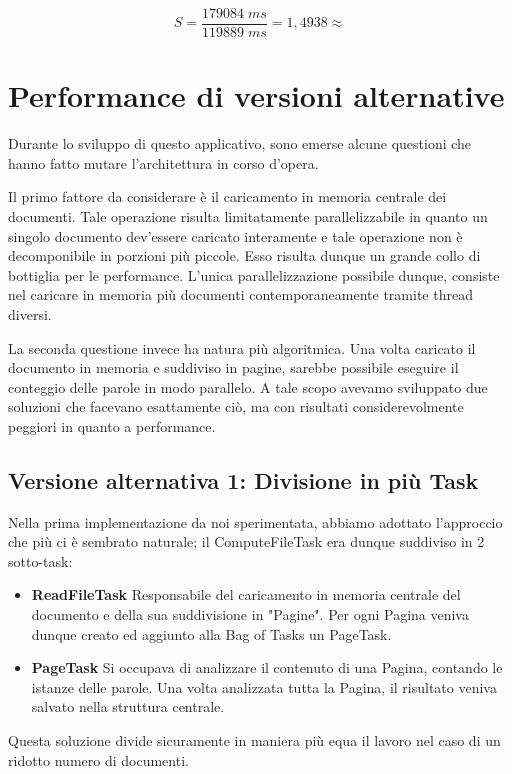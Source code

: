 $$ S = \frac{179084\;ms}{119889\;ms} = 1,4938 \approx$$
\section{Performance di versioni alternative}
Durante lo sviluppo di questo applicativo, sono emerse alcune questioni che hanno fatto mutare l'architettura in corso d'opera.\newline

\noindent Il primo fattore da considerare è il caricamento in memoria centrale dei documenti. Tale operazione risulta limitatamente parallelizzabile in quanto un singolo documento dev'essere caricato interamente e tale operazione non è decomponibile in porzioni più piccole. Esso risulta dunque un grande collo di bottiglia per le performance. L'unica parallelizzazione possibile dunque, consiste nel caricare in memoria più documenti contemporaneamente tramite thread diversi.\newline

\noindent La seconda questione invece ha natura più algoritmica. Una volta caricato il documento in memoria e suddiviso in pagine, sarebbe possibile eseguire il conteggio delle parole in modo parallelo. A tale scopo avevamo sviluppato due soluzioni che facevano esattamente ciò, ma con risultati considerevolmente peggiori in quanto a performance.

\subsection{Versione alternativa 1: Divisione in più Task}
Nella prima implementazione da noi sperimentata, abbiamo adottato l'approccio che più ci è sembrato naturale; il ComputeFileTask era dunque suddiviso in 2 sotto-task:
\begin{itemize}
    \item \textbf{ReadFileTask}\newline
    Responsabile del caricamento in memoria centrale del documento e della sua suddivisione in "Pagine". Per ogni Pagina veniva dunque creato ed aggiunto alla Bag of Tasks un PageTask.
    \item \textbf{PageTask}\newline
    Si occupava di analizzare il contenuto di una Pagina, contando le istanze delle parole. Una volta analizzata tutta la Pagina, il risultato veniva salvato nella struttura centrale.
\end{itemize}
Questa soluzione divide sicuramente in maniera più equa il lavoro nel caso di un ridotto numero di documenti. \newline

